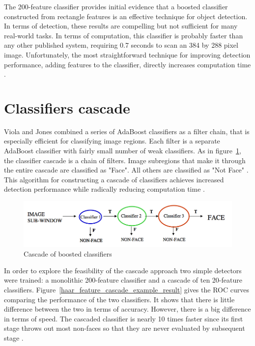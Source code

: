 \noindent The 200-feature classifier provides initial evidence that a boosted classifier constructed from rectangle features is an effective technique for object detection. In terms of detection, these results are compelling but not sufficient for many real-world tasks. In terms of computation, this classifier is probably faster than any other published system, requiring 0.7 seconds to scan an 384 by 288 pixel image. Unfortunately, the most straightforward technique for improving detection performance, adding features to the classifier, directly increases computation time \cite{VIO01}.
\newline

\section{Classifiers cascade}

\vspace{\baselineskip}
\noindent Viola and Jones combined a series of AdaBoost classifiers as a filter chain, that is especially efficient for classifying image regions. Each filter is a separate AdaBoost classifier with fairly small number of weak classifiers. As in figure~\ref{haar_feature_cascade}, the classifier cascade is a chain of filters. Image subregions that make it through the entire cascade are classified as "Face". All others are classified as "Not Face" \cite{HEW07}. This algorithm for constructing a cascade of classifiers achieves increased detection performance while radically reducing computation time \cite{VIO01}.
\newline

\begin{figure}[!h]
\begin{center}
\noindent \includegraphics[scale=0.5]{figures/haar_feature_cascade} 
\newline
\caption{Cascade of boosted classifiers}
\label{haar_feature_cascade}
\end{center} 
\end{figure}

\noindent In order to explore the feasibility of the cascade approach two simple detectors were trained: a monolithic 200-feature classifier and a cascade of ten 20-feature classifiers. Figure~\ref{haar_feature_cascade_example_result} gives the ROC curves comparing the performance of the two classifiers. It shows that there is little difference between the two in terms of accuracy. However, there is a big difference in terms of speed. The cascaded classifier is nearly 10 times faster since its first stage throws out most non-faces so that they are never evaluated by subsequent stage \cite{VIO01}.
\newline

